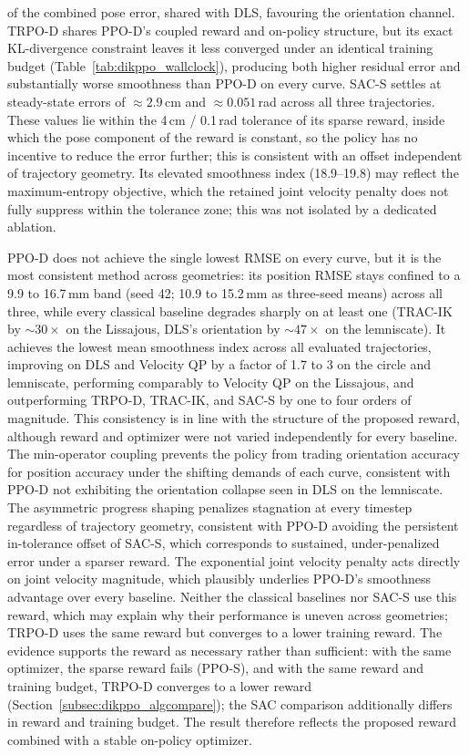 of the combined pose error, shared with DLS, favouring the orientation channel. TRPO-D shares
PPO-D's coupled reward and on-policy structure, but its exact KL-divergence constraint leaves it
less converged under an identical training budget (Table~\ref{tab:dikppo_wallclock}), producing both
higher residual error and substantially worse smoothness than PPO-D on every curve. SAC-S settles at
steady-state errors of $\approx 2.9$\,cm and $\approx 0.051$\,rad across all three trajectories.
These values lie within the 4\,cm / 0.1\,rad tolerance of its sparse reward, inside which the pose
component of the reward is constant, so the policy has no incentive to reduce the error further;
this is consistent with an offset independent of trajectory geometry. Its elevated smoothness index
(18.9--19.8) may reflect the maximum-entropy objective, which the retained joint velocity penalty
does not fully suppress within the tolerance zone; this was not isolated by a dedicated ablation.

PPO-D does not achieve the single lowest RMSE on every curve, but it is the most consistent method
across geometries: its position RMSE stays confined to a 9.9 to 16.7\,mm band (seed 42; 10.9 to
15.2\,mm as three-seed means) across all three, while every classical baseline degrades sharply on
at least one (TRAC-IK by $\sim 30\times$ on the Lissajous, DLS's orientation by $\sim 47\times$ on
the lemniscate). It achieves the lowest mean smoothness index across all evaluated trajectories,
improving on DLS and Velocity QP by a factor of 1.7 to 3 on the circle and lemniscate, performing
comparably to Velocity QP on the Lissajous, and outperforming TRPO-D, TRAC-IK, and SAC-S by one to
four orders of magnitude. This consistency is in line with the structure of the proposed reward,
although reward and optimizer were not varied independently for every baseline. The min-operator
coupling prevents the policy from trading orientation accuracy for position accuracy under the
shifting demands of each curve, consistent with PPO-D not exhibiting the orientation collapse seen
in DLS on the lemniscate. The asymmetric progress shaping penalizes stagnation at every timestep
regardless of trajectory geometry, consistent with PPO-D avoiding the persistent in-tolerance offset
of SAC-S, which corresponds to sustained, under-penalized error under a sparser reward. The
exponential joint velocity penalty acts directly on joint velocity magnitude, which plausibly
underlies PPO-D's smoothness advantage over every baseline. Neither the classical baselines nor
SAC-S use this reward, which may explain why their performance is uneven across geometries; TRPO-D
uses the same reward but converges to a lower training reward. The evidence supports the reward as
necessary rather than sufficient: with the same optimizer, the sparse reward fails (PPO-S), and with
the same reward and training budget, TRPO-D converges to a lower reward
(Section~\ref{subsec:dikppo_algcompare}); the SAC comparison additionally differs in reward and
training budget. The result therefore reflects the proposed reward combined with a stable on-policy
optimizer.

